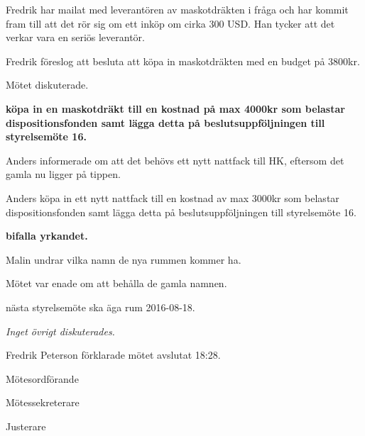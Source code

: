 \documentclass[10pt]{article}
\def\mo{Fredrik Peterson}
\def\ms{Erik Månsson}
\def\ji{Malin Lindström}
\begin{document}
\begin{paragrafer}
Fredrik har mailat med leverantören av maskotdräkten i fråga och har kommit fram till att det rör sig om ett inköp om cirka 300 USD. Han tycker att det verkar vara en seriös leverantör.

Fredrik föreslog att besluta att köpa in maskotdräkten med en budget på 3800kr.

Mötet diskuterade.

\textbf{\Mba köpa in en maskotdräkt till en kostnad på max 4000kr som belastar dispositionsfonden samt lägga detta på beslutsuppföljningen till styrelsemöte 16.}

Anders informerade om att det behövs ett nytt nattfack till HK, eftersom det gamla nu ligger på tippen.

Anders \ypa köpa in ett nytt nattfack till en kostnad av max 3000kr som belastar dispositionsfonden samt lägga detta på beslutsuppföljningen till styrelsemöte 16.

\textbf{\Mba bifalla yrkandet.}

Malin undrar vilka namn de nya rummen kommer ha.

Mötet var enade om att behålla de gamla namnen.

\Mba nästa styrelsemöte ska äga rum 2016-08-18.

\Ibfu

\emph{Inget övrigt diskuterades.}

{\mo} förklarade mötet avslutat 18:28.

\end{paragrafer}

\hidesignfoot
\begin{signatures}{3}
\signature{\mo}{Mötesordförande}
\signature{\ms}{Mötessekreterare}
\signature{\ji}{Justerare}
\end{signatures}
\end{document}
